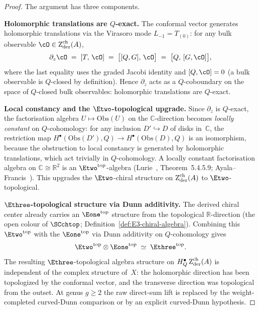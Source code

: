 \begin{proof}
The argument has three components.

\medskip\noindent
\textbf{Holomorphic translations are $Q$-exact.}
The conformal vector generates holomorphic translations via
the Virasoro mode $L_{-1} = T_{(0)}$: for any bulk observable
$\cO \in \Zder^{\mathrm{ch}}(A)$,
\begin{equation}\label{eq:dz-Q-exact}
\partial_z \cO \;=\; [T,\, \cO]
\;=\; \bigl[[Q, G],\, \cO\bigr]
\;=\; \bigl[Q,\, [G, \cO]\bigr],
\end{equation}
where the last equality uses the graded Jacobi identity and
$[Q, \cO] = 0$ (a bulk observable is $Q$-closed by definition).
Hence $\partial_z$ acts as a $Q$-coboundary on the space of
$Q$-closed bulk observables: holomorphic translations are
$Q$-exact.

\medskip\noindent
\textbf{Local constancy and the $\Etwo$-topological upgrade.}
Since $\partial_z$ is $Q$-exact, the factorisation algebra
$U \mapsto \mathrm{Obs}(U)$ on the $\mathbb{C}$-direction
becomes \emph{locally constant} on $Q$-cohomology: for any
inclusion $D' \hookrightarrow D$ of disks in~$\mathbb{C}$, the
restriction map $H^\bullet(\mathrm{Obs}(D'),Q) \to
H^\bullet(\mathrm{Obs}(D),Q)$ is an isomorphism, because the
obstruction to local constancy is generated by holomorphic
translations, which act trivially in $Q$-cohomology.
A locally constant factorisation algebra on
$\mathbb{C} \cong \mathbb{R}^2$ is an
$\Etwo^{\mathrm{top}}$-algebra
(Lurie~\cite{HA}, Theorem~5.4.5.9;
Ayala--Francis~\cite{AF15}).
This upgrades the $\Etwo$-chiral structure on
$\operatorname{Z}_{\mathrm{der}}^{\mathrm{ch}}(A)$ to $\Etwo$-topological.

\medskip\noindent
\textbf{$\Ethree$-topological structure via Dunn additivity.}
The derived chiral center already carries an
$\Eone^{\mathrm{top}}$ structure from the topological
$\mathbb{R}$-direction (the open colour of $\SCchtop$;
Definition~\ref{def:E3-chiral-algebra}).
Combining this $\Etwo^{\mathrm{top}}$ with the
$\Eone^{\mathrm{top}}$ via Dunn additivity on $Q$-cohomology gives
\begin{equation}\label{eq:E3-top-from-dunn}
\Etwo^{\mathrm{top}} \otimes \Eone^{\mathrm{top}}
\;\simeq\; \Ethree^{\mathrm{top}}.
\end{equation}
The resulting $\Ethree$-topological algebra structure on
$H_Q^\bullet\operatorname{Z}_{\mathrm{der}}^{\mathrm{ch}}(A)$ is independent of the complex
structure of~$X$: the holomorphic direction has been
topologized by the conformal vector, and the transverse
direction was topological from the outset. At genus $g\ge2$ the
raw direct-sum lift is replaced by the weight-completed
curved-Dunn comparison or by an explicit curved-Dunn hypothesis.
\end{proof}


